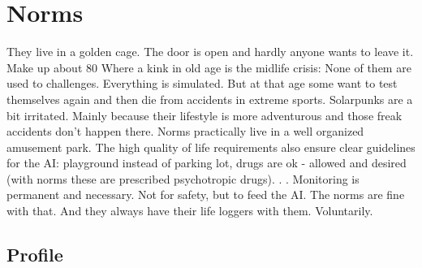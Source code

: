 \section{Norms}


They live in a golden cage. The door is open and hardly anyone wants to leave it.
Make up about 80%
Where a kink in old age is the midlife crisis:
None of them are used to challenges. Everything is simulated. But at that age some want to test themselves again and then die from accidents in extreme sports. Solarpunks are a bit irritated. Mainly because their lifestyle is more adventurous and those freak accidents don't happen there.
Norms practically live in a well organized amusement park. The high quality of life requirements also ensure clear guidelines for the AI: playground instead of parking lot, drugs are ok - allowed and desired (with norms these are prescribed psychotropic drugs). . . Monitoring is permanent and
necessary. Not for safety, but to feed the AI. The norms are fine with that. And they always have their life loggers with them. Voluntarily.


\subsection{Profile}

